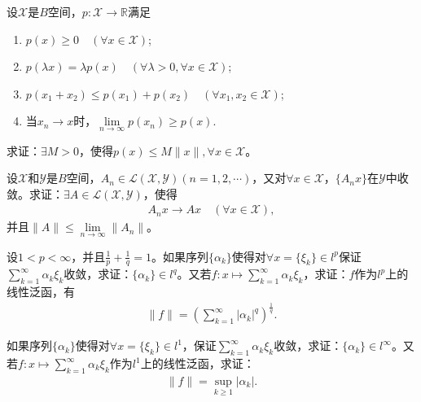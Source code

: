 \documentclass[../../main.tex]{subfiles}%
\begin{document}
\begin{lemma}[Gelfand引理]\label{lemma:泛函分析--Gelfand引理}
设$\mathscr{X}$是$B$空间，$p:\mathscr{X}\to\mathbb{R}$满足
\begin{enumerate}[(1)]
\item $p(x)\geqslant 0\quad (\forall x\in\mathscr{X})$;
\item $p(\lambda x)=\lambda p(x)\quad (\forall\lambda>0,\forall x\in\mathscr{X})$;
\item $p(x_1+x_2)\leqslant p(x_1)+p(x_2)\quad (\forall x_1,x_2\in\mathscr{X})$;
\item 当$x_n\to x$时，$\lim\limits_{n\to\infty}p(x_n)\geqslant p(x)$.
\end{enumerate}
求证：$\exists M>0$，使得$p(x)\leqslant M\|x\|,\forall x\in\mathscr{X}$。
\end{lemma}

\begin{example}
设$\mathscr{X}$和$\mathscr{Y}$是$B$空间，$A_n\in\mathscr{L}(\mathscr{X},\mathscr{Y})(n=1,2,\cdots)$，又对$\forall x\in\mathscr{X}$，$\{A_nx\}$在$\mathscr{Y}$中收敛。求证：$\exists A\in\mathscr{L}(\mathscr{X},\mathscr{Y})$，使得
\begin{align*}
A_nx\to Ax\quad (\forall x\in\mathscr{X}),
\end{align*}
并且$\|A\|\leqslant \lim\limits_{n\to\infty}\|A_n\|$。
\end{example}

\begin{example}
设$1<p<\infty$，并且$\frac{1}{p}+\frac{1}{q}=1$。如果序列$\{\alpha_k\}$使得对$\forall x=\{\xi_k\}\in l^p$保证$\sum\limits_{k=1}^{\infty}\alpha_k\xi_k$收敛，求证：$\{\alpha_k\}\in l^q$。又若$f:x\mapsto\sum\limits_{k=1}^{\infty}\alpha_k\xi_k$，求证：$f$作为$l^p$上的线性泛函，有
\begin{align*}
\|f\|=\left(\sum\limits_{k=1}^{\infty}|\alpha_k|^q\right)^{\frac{1}{q}}.
\end{align*}
\end{example}

\begin{example}
如果序列$\{\alpha_k\}$使得对$\forall x=\{\xi_k\}\in l^1$，保证$\sum\limits_{k=1}^{\infty}\alpha_k\xi_k$收敛，求证：$\{\alpha_k\}\in l^\infty$。又若$f:x\mapsto\sum\limits_{k=1}^{\infty}\alpha_k\xi_k$作为$l^1$上的线性泛函，求证：
\begin{align*}
\|f\|=\sup_{k\geqslant 1}|\alpha_k|.
\end{align*}
\end{example}
\end{document}
